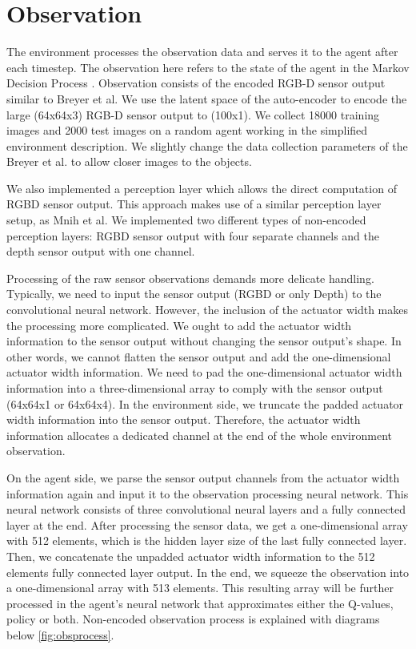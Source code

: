\section{Observation}

The environment processes the observation data and serves it to the agent after each timestep. The observation here refers to the state of the agent in the Markov Decision Process . Observation consists of the encoded RGB-D sensor output similar to Breyer et al. We use the latent space of the auto-encoder to encode the large (64x64x3) RGB-D sensor output to (100x1). We collect 18000 training images and 2000 test images on a random agent working in the simplified environment description. We slightly change the data collection parameters of the Breyer et al. to allow closer images to the objects.

We also implemented a perception layer which allows the direct computation of RGBD sensor output. This approach makes use of a similar perception layer setup, as Mnih et al. We implemented two different types of non-encoded perception layers: RGBD sensor output with four separate channels and the depth sensor output with one channel. 

Processing of the raw sensor observations demands more delicate handling. Typically, we need to input the sensor output (RGBD or only Depth) to the convolutional neural network. However, the inclusion of the actuator width makes the processing more complicated. We ought to add the actuator width information to the sensor output without changing the sensor output's shape. In other words, we cannot flatten the sensor output and add the one-dimensional actuator width information. We need to pad the one-dimensional actuator width information into a three-dimensional array to comply with the sensor output (64x64x1 or 64x64x4). In the environment side, we truncate the padded actuator width information into the sensor output. Therefore, the actuator width information allocates a dedicated channel at the end of the whole environment observation. 

On the agent side, we parse the sensor output channels from the actuator width information again and input it to the observation processing neural network. This neural network consists of three convolutional neural layers and a fully connected layer at the end. After processing the sensor data, we get a one-dimensional array with 512 elements, which is the hidden layer size of the last fully connected layer. Then, we concatenate the unpadded actuator width information to the 512 elements fully connected layer output. In the end, we squeeze the observation into a one-dimensional array with 513 elements. This resulting array will be further processed in the agent's neural network that approximates either the Q-values, policy or both. Non-encoded observation process is explained with diagrams below \ref{fig:obsprocess}.

